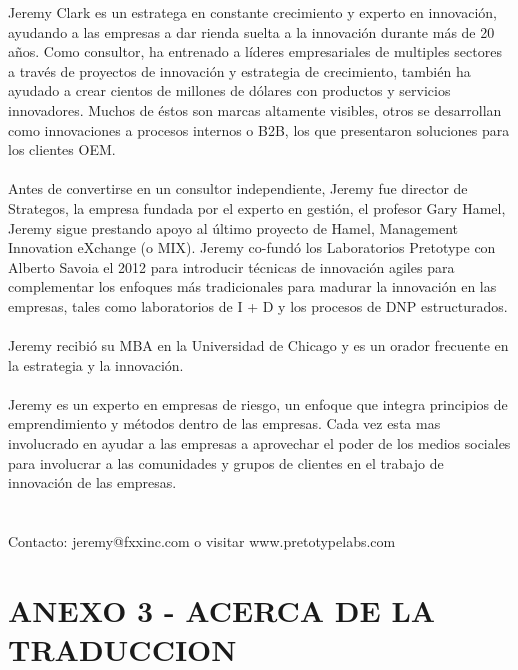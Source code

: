 \documentclass{article}
\begin{document}
Jeremy Clark es un estratega en constante crecimiento y experto en innovaci\'on, ayudando a las empresas a dar rienda suelta a la innovaci\'on durante m\'as de 20 a\~nos. Como consultor, ha entrenado a l\'ideres empresariales de multiples sectores a trav\'es de proyectos de innovaci\'on y estrategia de crecimiento, tambi\'en ha ayudado a crear cientos de millones de d\'olares con productos y servicios innovadores. Muchos de \'estos son marcas altamente visibles, otros se desarrollan como innovaciones a procesos internos o B2B, los que presentaron soluciones para los clientes OEM.
\\ \\
Antes de convertirse en un consultor independiente, Jeremy fue director de Strategos, la empresa fundada por el experto en gesti\'on, el profesor Gary Hamel, Jeremy sigue prestando apoyo al \'ultimo proyecto de Hamel, Management Innovation eXchange (o MIX). Jeremy co-fund\'o los Laboratorios Pretotype con Alberto Savoia el 2012 para introducir t\'ecnicas de innovaci\'on agiles para complementar los enfoques m\'as tradicionales para madurar la innovaci\'on en las empresas, tales como laboratorios de I + D y los procesos de DNP estructurados.
\\ \\
Jeremy recibi\'o su MBA en la Universidad de Chicago y es un orador frecuente en la estrategia y la innovaci\'on.
\\ \\
Jeremy es un experto en empresas de riesgo, un enfoque que integra principios de emprendimiento y m\'etodos dentro de las empresas. Cada vez esta mas involucrado en ayudar a las empresas a aprovechar el poder de los medios sociales para involucrar a las comunidades y grupos de clientes en el trabajo de innovaci\'on de las empresas.
\\ \\ \\
Contacto:  jeremy@fxxinc.com o visitar www.pretotypelabs.com
\clearpage

\section{ANEXO 3 - ACERCA DE LA TRADUCCION}
\end{document}
